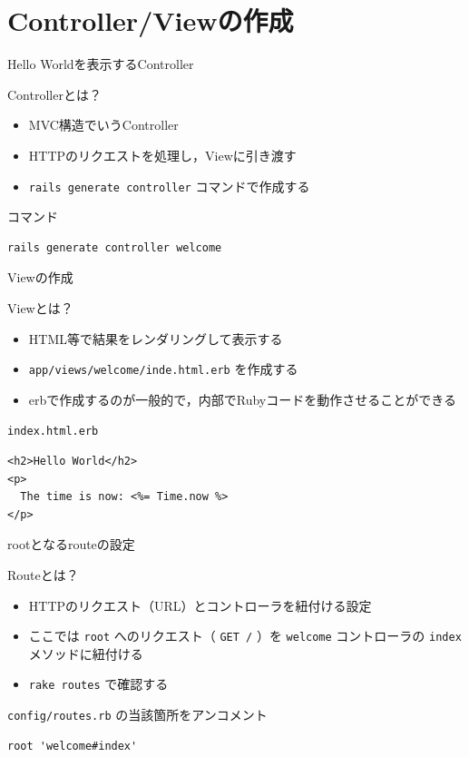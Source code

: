 \documentclass[t, aspectratio=169]{beamer}
\begin{document}
\section{Controller/Viewの作成}
\label{sec-6-2}
\begin{frame}[fragile,label=sec-6-2-1]{Hello Worldを表示するController}
 \begin{block}{Controllerとは？}
\begin{itemize}
\item MVC構造でいうController
\item HTTPのリクエストを処理し，Viewに引き渡す
\item \texttt{rails generate controller} コマンドで作成する
\end{itemize}
\end{block}
\begin{block}{コマンド}
\begin{verbatim}
rails generate controller welcome
\end{verbatim}
\end{block}
\end{frame}
\begin{frame}[fragile,label=sec-6-2-2]{Viewの作成}
 \begin{block}{Viewとは？}
\begin{itemize}
\item HTML等で結果をレンダリングして表示する
\item \texttt{app/views/welcome/inde.html.erb} を作成する
\item erbで作成するのが一般的で，内部でRubyコードを動作させることができる
\end{itemize}
\end{block}
\begin{block}{\texttt{index.html.erb}}
\begin{verbatim}
<h2>Hello World</h2>
<p>
  The time is now: <%= Time.now %>
</p>
\end{verbatim}
\end{block}
\end{frame}

\begin{frame}[fragile,label=sec-6-2-3]{rootとなるrouteの設定}
 \begin{block}{Routeとは？}
\begin{itemize}
\item HTTPのリクエスト（URL）とコントローラを紐付ける設定
\item ここでは \texttt{root} へのリクエスト（ \texttt{GET /} ）を \texttt{welcome} コントローラの \texttt{index} メソッドに紐付ける
\item \texttt{rake routes} で確認する
\end{itemize}
\end{block}
\begin{block}{\texttt{config/routes.rb} の当該箇所をアンコメント}
\begin{verbatim}
root 'welcome#index'
\end{verbatim}
\end{block}
\end{frame}
\end{document}
